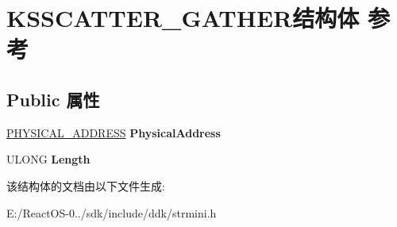 \hypertarget{struct_k_s_s_c_a_t_t_e_r___g_a_t_h_e_r}{}\section{K\+S\+S\+C\+A\+T\+T\+E\+R\+\_\+\+G\+A\+T\+H\+E\+R结构体 参考}
\label{struct_k_s_s_c_a_t_t_e_r___g_a_t_h_e_r}
\subsection*{Public 属性}
\begin{DoxyCompactItemize}
\item 
\mbox{\label{struct_k_s_s_c_a_t_t_e_r___g_a_t_h_e_r_a4446bb2dc118d2ddd3c83df03ef05b47}} 
\hyperlink{union___l_a_r_g_e___i_n_t_e_g_e_r}{P\+H\+Y\+S\+I\+C\+A\+L\+\_\+\+A\+D\+D\+R\+E\+SS} {\bfseries Physical\+Address}
\item 
\mbox{\label{struct_k_s_s_c_a_t_t_e_r___g_a_t_h_e_r_abb9553631939347ee596ef2073835260}} 
U\+L\+O\+NG {\bfseries Length}
\end{DoxyCompactItemize}


该结构体的文档由以下文件生成\+:\begin{DoxyCompactItemize}
\item 
E\+:/\+React\+O\+S-\/0../sdk/include/ddk/strmini.\+h\end{DoxyCompactItemize}
